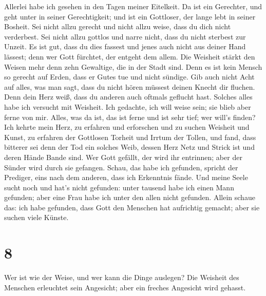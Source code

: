  Allerlei habe ich gesehen in den Tagen meiner Eitelkeit.
Da ist ein Gerechter, und geht unter in seiner Gerechtigkeit; und ist
ein Gottloser, der lange lebt in seiner Bosheit.  Sei
nicht allzu gerecht und nicht allzu weise, dass du dich nicht
verderbest.  Sei nicht allzu gottlos und narre nicht,
dass du nicht sterbest zur Unzeit.  Es ist gut, dass du
dies fassest und jenes auch nicht aus deiner Hand lässest; denn wer Gott
fürchtet, der entgeht dem allem.  Die Weisheit stärkt den
Weisen mehr denn zehn Gewaltige, die in der Stadt sind. 
Denn es ist kein Mensch so gerecht auf Erden, dass er Gutes tue und
nicht sündige.  Gib auch nicht Acht auf alles, was man
sagt, dass du nicht hören müssest deinen Knecht dir fluchen.
 Denn dein Herz weiß, dass du anderen auch oftmals
geflucht hast.  Solches alles habe ich versucht mit
Weisheit. Ich gedachte, ich will weise sein; sie blieb aber ferne von
mir.  Alles, was da ist, das ist ferne und ist sehr tief;
wer will's finden?  Ich kehrte mein Herz, zu erfahren und
erforschen und zu suchen Weisheit und Kunst, zu erfahren der Gottlosen
Torheit und Irrtum der Tollen,  und fand, dass bitterer
sei denn der Tod ein solches Weib, dessen Herz Netz und Strick ist und
deren Hände Bande sind. Wer Gott gefällt, der wird ihr entrinnen; aber
der Sünder wird durch sie gefangen.  Schau, das habe ich
gefunden, spricht der Prediger, eins nach dem anderen, dass ich
Erkenntnis fände.  Und meine Seele sucht noch und hat's
nicht gefunden: unter tausend habe ich einen Mann gefunden; aber eine
Frau habe ich unter den allen nicht gefunden.  Allein
schaue das: ich habe gefunden, dass Gott den Menschen hat aufrichtig
gemacht; aber sie suchen viele Künste.

\hypertarget{section-7}{%
\section{8}\label{section-7}}

 Wer ist wie der Weise, und wer kann die Dinge auslegen?
Die Weisheit des Menschen erleuchtet sein Angesicht; aber ein freches
Angesicht wird gehasst.

